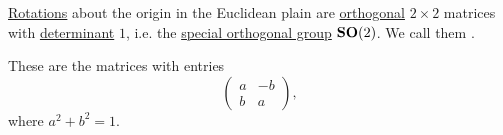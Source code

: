 \begin{proposition}\label{thm:plane_rotation_matrix}
  \hyperref[def:rigid_motion/rotation]{Rotations} about the origin in the Euclidean plain are \hyperref[def:unitary_matrix]{orthogonal} \( 2 \times 2 \) matrices with \hyperref[def:matrix_determinant]{determinant} \( 1 \), i.e. the \hyperref[def:unitary_groups]{special orthogonal group} \( \operatorname{\mathbf{SO}}(2) \). We call them .

  These are the matrices with entries
  \begin{equation}\label{eq:thm:plane_rotation_matrix}
    \begin{pmatrix}
      a & -b \\
      b & a
    \end{pmatrix},
  \end{equation}
  where \( a^2 + b^2 = 1 \).
\end{proposition}
